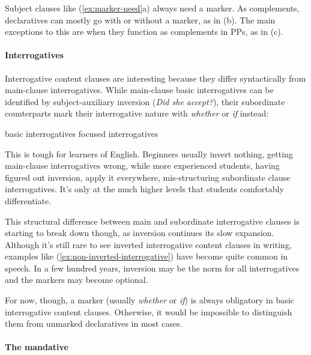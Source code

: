 \noindent Subject clauses like (\ref{ex:marker-need}a) always need a marker. As complements, declaratives can mostly go with or without a marker, as in (b). The main exceptions to this are when they function as complements in PPs, as in (c).

\paragraph*{Interrogatives}\label{sec:sub-interrog} Interrogative content clauses are interesting because they differ syntactically from main-clause interrogatives. While main-clause basic interrogatives can be identified by subject-auxiliary inversion (\textit{Did she accept?}), their subordinate counterparts mark their interrogative nature with \textit{whether} or \textit{if} instead:

\ea basic interrogatives\label{ex:int-sub}
    \z
\z
\ea focused interrogatives
    \z
\z

This is tough for learners of English. Beginners usually invert nothing, getting main-clause interrogatives wrong, while more experienced students, having figured out inversion, apply it everywhere, mis-structuring subordinate clause interrogatives. It's only at the much higher levels that students comfortably differentiate.

This structural difference between main and subordinate interrogative clauses is starting to break down though, as inversion continues its slow expansion. Although it's still rare to see inverted interrogative content clauses in writing, examples like (\ref{ex:non-inverted-interrogative}) have become quite common in speech. In a few hundred years, inversion may be the norm for all interrogatives and the markers may become optional.

\label{ex:non-inverted-interrogative}
\z

For now, though, a marker (usually \textit{whether} or \textit{if}) is always obligatory in basic interrogative content clauses. Otherwise, it would be impossible to distinguish them from unmarked declaratives in most cases.

\paragraph{The mandative}

